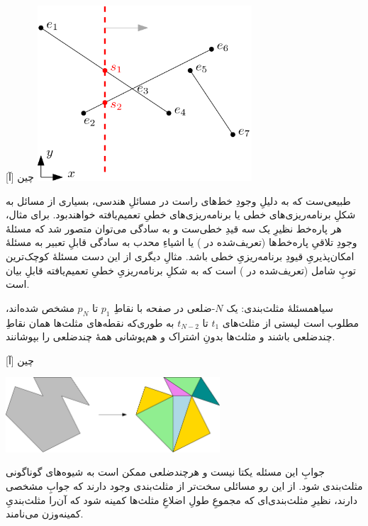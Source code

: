 [آ]
‌چین
\includegraphics[width=0.6\textwidth]{figs/sweep-line.png}
 
طبیعی‌ست که به دلیلِ وجودِ خط‌های راست در مسائلِ هندسی، بسیاری از مسائل به شکلِ برنامه‌ریزی‌های خطی یا برنامه‌ریزی‌های خطیِ تعمیم‌یافته خواهندبود.
برای مثال، هر پاره‌خط نظیرِ یک سه قیدِ خطی‌ست و به سادگی می‌توان متصور شد که مسئلهٔ وجودِ تلاقیِ پاره‌خط‌ها  (تعریف‌شده در ) یا اشیاءِ محدب به سادگی قابلِ تعبیر به مسئلهٔ امکان‌پذیریِ قیودِ برنامه‌ریزیِ خطی باشد. مثالِ دیگری از این دست مسئلهٔ کوچک‌ترین توپِ شامل (تعریف‌شده در ) است که به شکلِ برنامه‌ریزیِ خطیِ تعمیم‌یافته قابلِ بیان است.

‌سیاه{مسئلهٔ مثلث‌بندی}: یک $N$-ضلعی در صفحه با نقاطِ $p_1$ تا $p_N$ مشخص شده‌اند، مطلوب است لیستی از مثلث‌های $t_1$ تا $t_{N-2}$ به طوری‌که نقطه‌های مثلث‌ها همان نقاطِ چندضلعی باشند و مثلث‌ها بدونِ اشتراک و هم‌پوشانی همهٔ چندضلعی را بپوشانند. 

[آ]
‌چین

\includegraphics[width=0.6\textwidth]{figs/triangulation.png}

جوابِ این مسئله یکتا نیست و هرچندضلعی ممکن است به شیوه‌های گوناگونی مثلث‌بندی شود. از این رو مسائلی سخت‌تر از مثلث‌بندی وجود دارند که جوابِ مشخصی دارند، نظیرِ مثلث‌بندی‌ای که مجموعِ طولِ اضلاعِ مثلث‌ها کمینه شود که آن‌را مثلث‌بندیِ کمینه‌وزن می‌نامند.  

